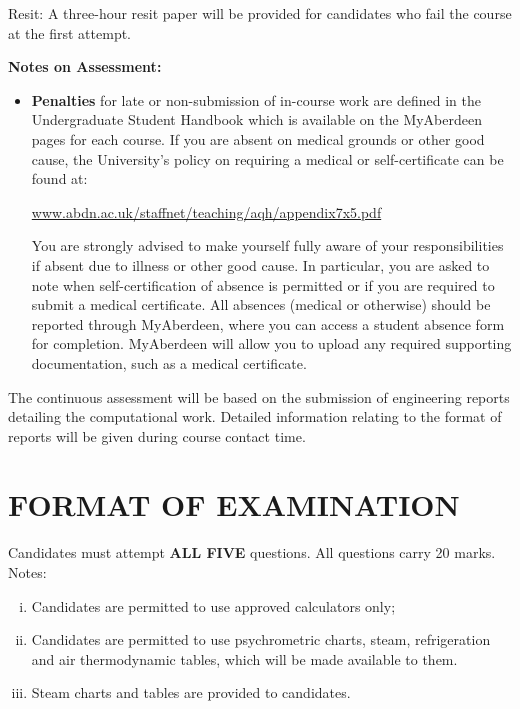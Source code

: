 \documentclass[12pts,a4paper,amsmath,amssymb,floatfix]{article}%
\begin{document}
Resit: A three-hour resit paper will be provided for candidates who fail the course at the first attempt. 
\medskip

\medskip
{\bf Notes on Assessment:}
\begin{itemize}
\item {\bf Penalties} for late or non-submission of in-course work are defined in the Undergraduate Student Handbook which is available on the MyAberdeen pages for each course. If you are absent on medical grounds or other good cause, the University's policy on requiring a medical or self-certificate can be found at:
\begin{center}
\href{www.abdn.ac.uk/staffnet/teaching/aqh/appendix7x5.pdf}{www.abdn.ac.uk/staffnet/teaching/aqh/appendix7x5.pdf}
\end{center}
You are strongly advised to make yourself fully aware of your responsibilities if absent due to illness or other good cause. In particular, you are asked to note when self-certification of absence is permitted or if you are required to submit a medical certificate. All absences (medical or otherwise) should be reported through MyAberdeen, where you can access a student absence form for completion. MyAberdeen will allow you to upload any required supporting documentation, such as a medical certificate. 

\begin{comment}
Please also note that the {\bf late submission penalties} for undergraduate work have now been changed to conform to the PGT penalty arrangements, as follows
\begin{enumerate}
   \item Up to one week late, 2 CGS points deducted
   \item Up to two weeks late, 3 CGS point deducted
   \item More than two weeks late no marks awarded
\end{enumerate}
\end{comment}
\end{itemize}

\medskip

The continuous assessment will be based on the submission of engineering reports detailing the computational work. Detailed information relating to the format of reports will be given during course contact time.


\section{FORMAT OF EXAMINATION}
Candidates must attempt {\bf ALL FIVE} questions. All questions carry 20 marks. Notes:
\begin{enumerate}[(i)] 
  \item Candidates are permitted to use approved calculators only;
  \item Candidates are permitted to use psychrometric charts, steam, refrigeration and air thermodynamic tables, which will be made available to them.
  \item Steam charts and tables are provided to candidates.
\end{enumerate}
\end{document}
